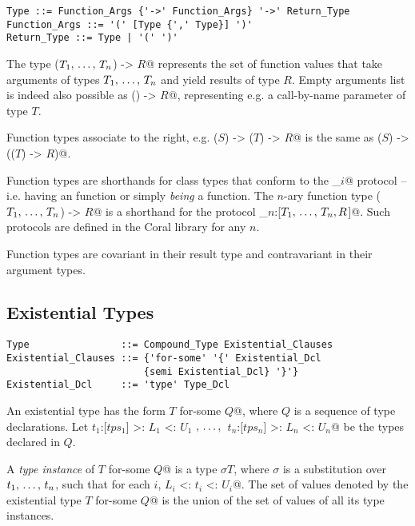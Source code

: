 \syntax\begin{lstlisting}
Type ::= Function_Args {'->' Function_Args} '->' Return_Type
Function_Args ::= '(' [Type {',' Type}] ')'
Return_Type ::= Type | '(' ')'
\end{lstlisting}

The type \lstinline@($T_1 ,\, \ldots ,\, T_n$) -> $R$@ represents the set of function values that take arguments of types $T_1 ,\, \ldots ,\, T_n$ and yield results of type $R$. Empty arguments list is indeed also possible as \lstinline@() -> $R$@, representing e.g. a call-by-name parameter of type $T$.

Function types associate to the right, e.g. \lstinline@($S$) -> ($T$) -> $R$@ is the same as \lstinline@($S$) -> (($T$) -> $R$)@. 

Function types are shorthands for class types that conform to the \lstinline@Function_$i$@ protocol -- i.e. having an  function or simply {\em being} a function. The $n$-ary function type \lstinline@($T_1 ,\, \ldots ,\, T_n$) -> $R$@ is a shorthand for the protocol \lstinline@Function_$n$:[$T_1 ,\, \ldots ,\, T_n,R$]@. Such protocols are defined in the Coral library for any $n$. 

Function types are covariant in their result type and contravariant in their argument types. 

\subsection{Existential Types}
\label{sec:existential-types}

\syntax\begin{lstlisting}[escapechar=@]
Type                ::= Compound_Type Existential_Clauses
Existential_Clauses ::= {'for-some' '{' Existential_Dcl
                        {semi Existential_Dcl} '}'}
Existential_Dcl     ::= 'type' Type_Dcl
\end{lstlisting}

An existential type has the form \lstinline@$T$ for-some {$Q$}@, where $Q$ is a sequence of type declarations. Let \lstinline@$t_1$:[$tps_1$] >: $L_1$ <: $U_1$ $,\, \ldots ,\,$ $t_n$:[$tps_n$] >: $L_n$ <: $U_n$@ be the types declared in $Q$. 

A {\em type instance} of \lstinline@$T$ for-some {$Q$}@ is a type $\sigma T$, where $\sigma$ is a substitution over $t_1 ,\, \ldots ,\, t_n$, such that for each $i$, \lstinline@$L_i$ <: $t_i$ <: $U_i$@. The set of values denoted by the existential type \lstinline@$T$ for-some {$Q$}@ is the union of the set of values of all its type instances. 

